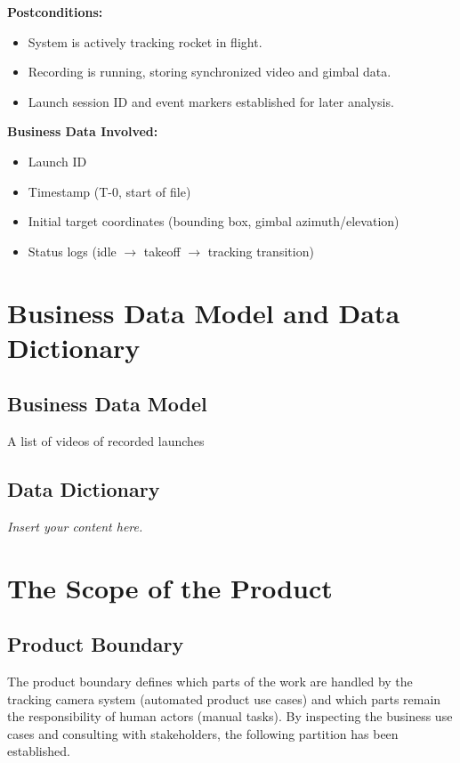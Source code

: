 \documentclass[12pt]{article}
\newcommand{\lips}{\textit{Insert your content here.}}
\begin{document}
\textbf{Postconditions:}
\begin{itemize}
  \item System is actively tracking rocket in flight.
  \item Recording is running, storing synchronized video and gimbal data.
  \item Launch session ID and event markers established for later analysis.
\end{itemize}

\textbf{Business Data Involved:}
\begin{itemize}
  \item Launch ID
  \item Timestamp (T-0, start of file)
  \item Initial target coordinates (bounding box, gimbal azimuth/elevation)
  \item Status logs (idle $\rightarrow$ takeoff $\rightarrow$ tracking transition)
\end{itemize}

\section{Business Data Model and Data Dictionary}
\subsection{Business Data Model}

A list of videos of recorded launches

\subsection{Data Dictionary}
\lips

\section{The Scope of the Product}
\subsection{Product Boundary}

The product boundary defines which parts of the work are handled by the
tracking camera system (automated product use cases) and which parts remain the
responsibility of human actors (manual tasks). By inspecting the business use
cases and consulting with stakeholders, the following partition has been
established.
\end{document}
